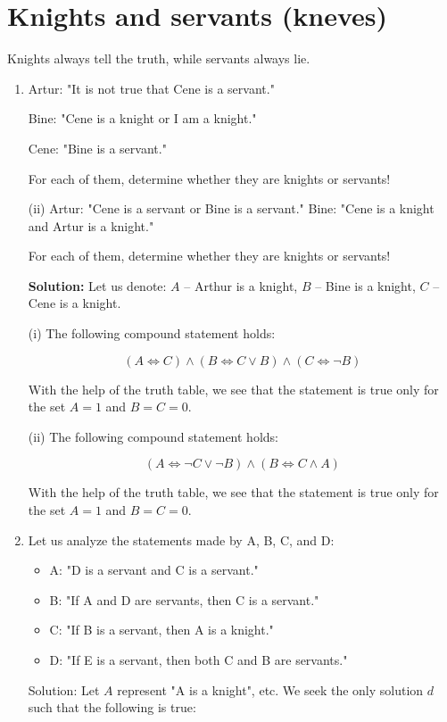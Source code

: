 \documentclass[11pt,paper=b5,footinclude,headinclude]{scrbook} %
\theoremstyle{remark}
\theoremstyle{definition} %
\theoremstyle{theorem} %
\begin{document}
\section{Knights and servants (kneves)}
Knights always tell the truth, while servants always lie.


\begin{enumerate}[Problem 1.]

\item 
 Artur: "It is not true that Cene is a servant."
 
Bine: "Cene is a knight or I am a knight."

Cene: "Bine is a servant."

For each of them, determine whether they are knights or servants!

(ii) Artur: "Cene is a servant or Bine is a servant."
Bine: "Cene is a knight and Artur is a knight."

For each of them, determine whether they are knights or servants!

\textbf{Solution:}
Let us denote: $A$ – Arthur is a knight, $B$ – Bine is a knight, $C$ – Cene is a knight.

(i) The following compound statement holds:

\[
(A \iff C) \land (B \iff C \lor B) \land (C \iff \neg B)
\]

With the help of the truth table, we see that the statement is true only for the set $A = 1$ and $B = C = 0$.

(ii) The following compound statement holds:

\[
(A \iff \neg C \lor \neg B) \land (B \iff C \land A)
\]

With the help of the truth table, we see that the statement is true only for the set $A = 1$ and $B = C = 0$.

    \item Let us analyze the statements made by A, B, C, and D:

\begin{itemize}
    \item A: "D is a servant and C is a servant."
    \item B: "If A and D are servants, then C is a servant."
    \item C: "If B is a servant, then A is a knight."
    \item D: "If E is a servant, then both C and B are servants."
\end{itemize}

Solution: Let \( A \) represent "A is a knight", etc. We seek the only solution \( d \) such that the following is true:


\end{enumerate}
\end{document}
